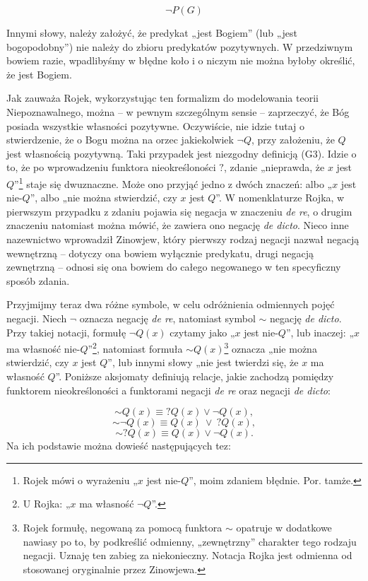 \begin{equation}
    \neg P(G)
\end{equation}


Innymi słowy, należy założyć, że predykat „jest Bogiem” (lub „jest
bogopodobny”) nie należy do zbioru predykatów pozytywnych. W
przedziwnym bowiem razie, wpadlibyśmy w błędne koło i o niczym nie
można byłoby określić, że jest Bogiem.

Jak zauważa Rojek, wykorzystując ten formalizm do modelowania teorii
Niepoznawalnego, można -- w pewnym szczególnym sensie -- zaprzeczyć, że
Bóg posiada wszystkie własności pozytywne. Oczywiście, nie idzie tutaj
o stwierdzenie, że o Bogu można na orzec jakiekolwiek
$\neg Q$, przy założeniu, że $Q$ jest własnością pozytywną.
Taki przypadek jest niezgodny definicją (G3). Idzie o to, że po
wprowadzeniu funktora nieokreśloności $?$, zdanie „nieprawda, że $x$ jest
$Q$”\footnote{Rojek mówi o wyrażeniu „$x$ jest nie-$Q$”, moim zdaniem
błędnie. Por. tamże. } staje się dwuznaczne. Może ono przyjąć jedno
z dwóch znaczeń: albo „$x$ jest nie-$Q$”, albo „nie można stwierdzić, czy $x$
jest $Q$”. W nomenklaturze Rojka, w pierwszym przypadku z zdaniu pojawia
się negacja w znaczeniu \textit{de re}, o drugim znaczeniu natomiast
można mówić, że zawiera ono negację \textit{de dicto}. Nieco inne
nazewnictwo wprowadził Zinowjew, który pierwszy rodzaj negacji nazwał
negacją wewnętrzną -- dotyczy ona bowiem wyłącznie predykatu, drugi
negacją zewnętrzną -- odnosi się ona bowiem do całego negowanego w ten
specyficzny sposób zdania.

Przyjmijmy teraz dwa różne symbole, w celu odróżnienia odmiennych pojęć
negacji. Niech $\neg$ oznacza negację \textit{de re},
natomiast symbol $\sim$ negację \textit{de dicto}. Przy
takiej notacji, formułę $\neg Q(x)$ czytamy jako „$x$ jest
nie-$Q$”, lub  inaczej: „$x$ ma własność nie-$Q$”\footnote{U Rojka: „$x$ ma
własność $\neg Q$”. }, natomiast formuła
$\sim\! Q(x)$\footnote{Rojek formułę, negowaną za pomocą
funktora $\sim$ opatruje w dodatkowe nawiasy po to, by
podkreślić odmienny, „zewnętrzny” charakter tego rodzaju negacji.
Uznaję ten zabieg za niekonieczny. Notacja Rojka jest odmienna od
stosowanej oryginalnie przez Zinowjewa. } oznacza „nie można
stwierdzić, czy $x$ jest $Q$”, lub  innymi słowy „nie jest twierdzi się, że
$x$ ma własność $Q$”. Poniższe aksjomaty definiują relacje, jakie zachodzą
pomiędzy funktorem nieokreśloności a funktorami negacji \textit{de re}
oraz negacji \textit{de dicto}:

\begin{equation}\tag{Z1}
\sim\! Q(x) \equiv ?Q(x) \lor \neg Q(x),
\end{equation}
\begin{equation}\tag{Z2}
\sim\!\neg Q(x) \equiv Q(x)\ \lor\ ?Q(x),
\end{equation}
\begin{equation}\tag{Z3}
\sim ?Q(x) \equiv Q(x) \lor \neg Q(x).
\end{equation}
Na ich podstawie można dowieść następujących tez:

